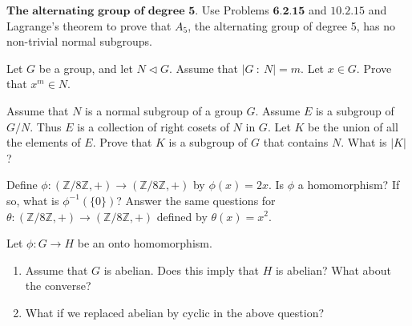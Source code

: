 \documentclass[12pt,letterpaper,boxed]{hmcpset}
\begin{document}

\begin{problem}[10.2.17]
$\textbf{The alternating group of degree 5.}$ Use Problems $\textbf{6.2.15}$ and $\textit{10.2.15}$ and Lagrange's theorem to prove that $A_5$, the alternating group of degree 5, has no non-trivial normal subgroups. 
\end{problem}

\begin{solution}
\end{solution}

\clearpage

\begin{problem}[10.3.9]
Let $G$ be a group, and let $N \triangleleft G$. Assume that $ \vert G \ : \ N \vert = m $. Let $ x \in G $. Prove that $x^m \in N$.
\end{problem}

\begin{solution}
\end{solution}

\clearpage

\begin{problem}[10.3.11]
Assume that $N$ is a normal subgroup of a group $G$. Assume $E$ is a subgroup of $G/N$. Thus $E$ is a collection of right cosets of $N$ in $G$. Let $K$ be the union of all the elements of $E$. Prove that $K$ is a subgroup of $G$ that contains $N$. What is $\vert K \vert$?
\end{problem}

\begin{solution}
\end{solution}

\clearpage

\begin{problem}[11.1.2]
Define $\phi: \left( \mathbb{Z}/8\mathbb{Z}, + \right) \rightarrow \left( \mathbb{Z}/8\mathbb{Z}, + \right) $ by $ \phi(x) = 2x $. Is $\phi$ a homomorphism? If so, what is $\phi^{-1}(\{0\})$? Answer the same questions for $\theta: \left( \mathbb{Z}/8\mathbb{Z}, + \right) \rightarrow \left( \mathbb{Z}/8\mathbb{Z}, + \right) $ defined by $\theta(x) = x^2$.
\end{problem}

\begin{solution}
\end{solution}

\clearpage

\begin{problem}[11.1.10]
Let $\phi: G \rightarrow H$ be an onto homomorphism.
\begin{enumerate}[label=\alph*]
\item Assume that $G$ is abelian. Does this imply that $H$ is abelian? What about the converse? 
\item What if we replaced abelian by cyclic in the above question?
\end{enumerate}
\end{problem}

\begin{solution}

\end{solution}
\end{document}
